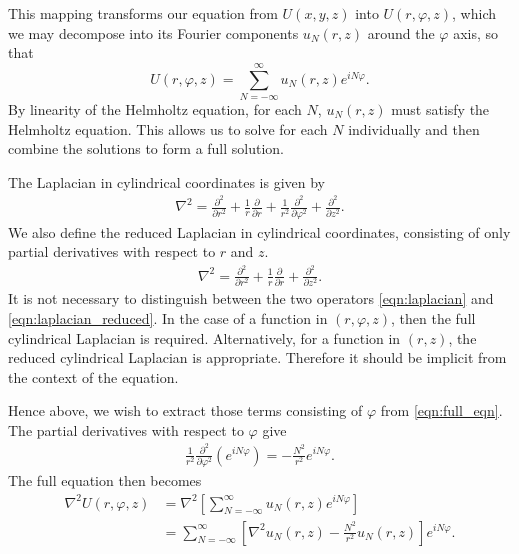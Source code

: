 This mapping transforms our equation from $U(x,y,z)$ into $U(r,\varphi,z)$, 
which we may decompose into its Fourier components $u_N(r,z)$ around the $\varphi$ axis, so that
\begin{equation}
	U(r,\varphi,z) = \sum_{N=-\infty}^\infty u_N(r,z) e^{iN\varphi}. \label{eqn:full_eqn}
\end{equation}
By linearity of the Helmholtz equation, for each $N$, $u_N(r,z)$ must satisfy the Helmholtz equation.
This allows us to solve for each $N$ individually and then combine the solutions to form a full solution.

The Laplacian in cylindrical coordinates is given by
\begin{align}
	\nabla^2 = \frac{\partial^2 }{\partial r^2}
			 + \frac{1}{r} \frac{\partial }{\partial r}
			 + \frac{1}{r^2} \frac{\partial^2 }{\partial \varphi^2}
			 + \frac{\partial^2 }{\partial z^2}. \label{eqn:laplacian}
\end{align}
We also define the reduced Laplacian in cylindrical coordinates, consisting of only partial derivatives with respect to $r$ and $z$.
\begin{align}
	\nabla^2 = \frac{\partial^2 }{\partial r^2}
			 + \frac{1}{r} \frac{\partial }{\partial r}
			 + \frac{\partial^2 }{\partial z^2}. \label{eqn:laplacian_reduced}
\end{align}
It is not necessary to distinguish between the two operators \eqref{eqn:laplacian} and \eqref{eqn:laplacian_reduced}.
In the case of a function in $(r,\varphi,z)$, then the full cylindrical Laplacian is required.
Alternatively, for a function in $(r,z)$, the reduced cylindrical Laplacian is appropriate.
Therefore it should be implicit from the context of the equation.

Hence above, we wish to extract those terms consisting of $\varphi$ from \eqref{eqn:full_eqn}.
The partial derivatives with respect to $\varphi$ give
\begin{align}
	\frac{1}{r^2} \frac{\partial^2 }{\partial \varphi^2} \left( e^{i N \varphi}\right) = - \frac{N^2}{r^2} e^{i N \varphi}.
\end{align}
The full equation then becomes
\begin{align}
	\nabla^2 U(r,\varphi,z) 
		&= \nabla^2 \left[\sum_{N=-\infty}^\infty u_N(r,z) e^{i N \varphi}\right] \\
		&= \sum_{N=-\infty}^\infty \left[ 
										\nabla^2 u_N(r,z) - \frac{N^2}{r^2}u_N(r,z)
								   \right] e^{i N \varphi}.
\end{align}

